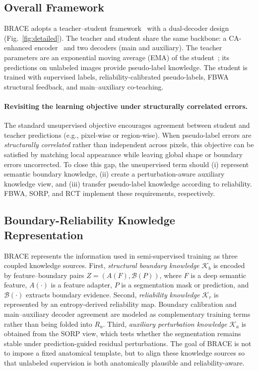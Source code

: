 \documentclass[a4paper,fleqn]{cas-dc}
\begin{document}
\subsection{Overall Framework}

BRACE adopts a teacher--student framework~\cite{b19} with a dual-decoder design (Fig.~\ref{fig:detailed}). The teacher and student share the same backbone: a CA-enhanced encoder~\cite{b7} and two decoders (main and auxiliary). The teacher parameters are an exponential moving average (EMA) of the student~\cite{b19}; its predictions on unlabeled images provide pseudo-label knowledge. The student is trained with supervised labels, reliability-calibrated pseudo-labels, FBWA structural feedback, and main--auxiliary co-teaching.

\paragraph{Revisiting the learning objective under structurally correlated errors.} The standard unsupervised objective encourages agreement between student and teacher predictions (e.g., pixel-wise or region-wise). When pseudo-label errors are \emph{structurally correlated} rather than independent across pixels, this objective can be satisfied by matching local appearance while leaving global shape or boundary errors uncorrected. To close this gap, the unsupervised term should (i) represent semantic boundary knowledge, (ii) create a perturbation-aware auxiliary knowledge view, and (iii) transfer pseudo-label knowledge according to reliability. FBWA, SORP, and RCT implement these requirements, respectively.

\subsection{Boundary-Reliability Knowledge Representation}

BRACE represents the information used in semi-supervised training as three coupled knowledge sources. First, \emph{structural boundary knowledge} $\mathcal{K}_b$ is encoded by feature--boundary pairs $Z=(A(F),\mathcal{B}(P))$, where $F$ is a deep semantic feature, $A(\cdot)$ is a feature adapter, $P$ is a segmentation mask or prediction, and $\mathcal{B}(\cdot)$ extracts boundary evidence. Second, \emph{reliability knowledge} $\mathcal{K}_r$ is represented by an entropy-derived reliability map. Boundary calibration and main--auxiliary decoder agreement are modeled as complementary training terms rather than being folded into $R_u$. Third, \emph{auxiliary perturbation knowledge} $\mathcal{K}_a$ is obtained from the SORP view, which tests whether the segmentation remains stable under prediction-guided residual perturbations. The goal of BRACE is not to impose a fixed anatomical template, but to align these knowledge sources so that unlabeled supervision is both anatomically plausible and reliability-aware.
\end{document}
